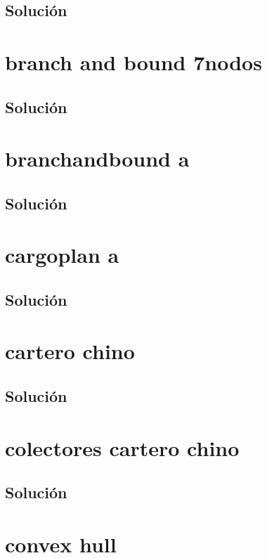 \documentclass[a4paper,10pt,onecolumn]{report}
\begin{document}
\subsection*{Solución}

\clearpage
\section{branch and bound 7nodos}

\subsection*{Solución}

\clearpage
\section{branchandbound a}

\subsection*{Solución}

\clearpage
\section{cargoplan a}

\subsection*{Solución}

\clearpage
\section{cartero chino}

\subsection*{Solución}

\clearpage
\section{colectores cartero chino}

\subsection*{Solución}

\clearpage
\section{convex hull}

\end{document}
